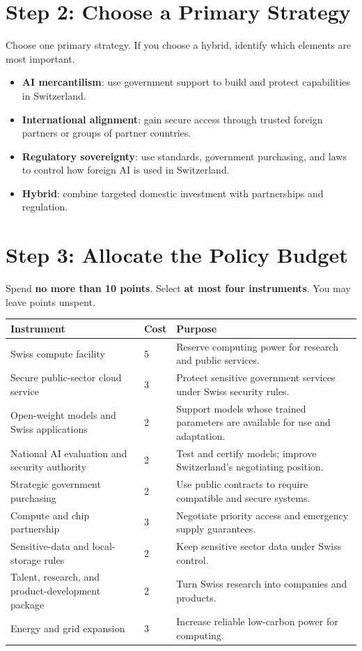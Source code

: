\documentclass[11pt]{article}
\renewcommand{\arraystretch}{1.18}
\begin{document}
\section*{Step 2: Choose a Primary Strategy}
Choose one primary strategy. If you choose a hybrid, identify which elements are most important.
\begin{itemize}
  \item \textbf{AI mercantilism}: use government support to build and protect capabilities in Switzerland.
  \item \textbf{International alignment}: gain secure access through trusted foreign partners or groups of partner countries.
  \item \textbf{Regulatory sovereignty}: use standards, government purchasing, and laws to control how foreign AI is used in Switzerland.
  \item \textbf{Hybrid}: combine targeted domestic investment with partnerships and regulation.
\end{itemize}

\newpage
\thispagestyle{fancy}
\section*{Step 3: Allocate the Policy Budget}
Spend \textbf{no more than 10 points}. Select \textbf{at most four instruments}. You may leave points unspent.

\begingroup
\footnotesize
\renewcommand{\arraystretch}{1.08}
\begin{tabularx}{\textwidth}{p{} p{} X}
\toprule
\textbf{Instrument} & \textbf{Cost} & \textbf{Purpose} \\
\midrule
Swiss compute facility & 5 & Reserve computing power for research and public services. \\
Secure public-sector cloud service & 3 & Protect sensitive government services under Swiss security rules. \\
Open-weight models and Swiss applications & 2 & Support models whose trained parameters are available for use and adaptation. \\
National AI evaluation and security authority & 2 & Test and certify models; improve Switzerland's negotiating position. \\
Strategic government purchasing & 2 & Use public contracts to require compatible and secure systems. \\
Compute and chip partnership & 3 & Negotiate priority access and emergency supply guarantees. \\
Sensitive-data and local-storage rules & 2 & Keep sensitive sector data under Swiss control. \\
Talent, research, and product-development package & 2 & Turn Swiss research into companies and products. \\
Energy and grid expansion & 3 & Increase reliable low-carbon power for computing. \\
\bottomrule
\end{tabularx}
\endgroup
\end{document}
